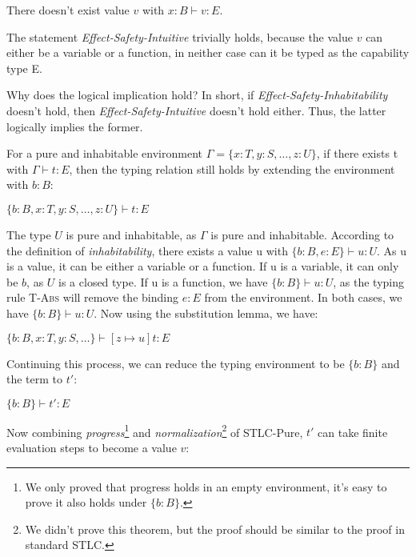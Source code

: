 \begin{definition}
  There doesn't exist value $v$ with $x:B \vdash v : E$.
\end{definition}

The statement \emph{Effect-Safety-Intuitive} trivially holds, because
the value $v$ can either be a variable or a function, in neither case
can it be typed as the capability type E.

Why does the logical implication hold? In short, if
\emph{Effect-Safety-Inhabitability} doesn't hold, then
\emph{Effect-Safety-Intuitive} doesn't hold either. Thus, the latter
logically implies the former.

For a pure and inhabitable environment
$\Gamma = \{x:T, y:S, \dots, z:U\}$, if there exists t with
$\Gamma \vdash t : E$, then the typing relation still holds by
extending the environment with $b:B$:

\begin{center}
$\{b:B, x:T, y:S, \dots, z:U\} \vdash t: E$
\end{center}

The type $U$ is pure and inhabitable, as $\Gamma$ is pure and
inhabitable. According to the definition of \emph{inhabitability},
there exists a value u with $\{b:B, e:E\} \vdash u: U$. As u is a
value, it can be either a variable or a function. If u is a variable,
it can only be $b$, as $U$ is a closed type. If u is a function, we
have $\{b:B\} \vdash u: U$, as the typing rule \textsc{T-Abs} will
remove the binding $e:E$ from the environment. In both cases, we have
$\{b:B\} \vdash u: U$. Now using the substitution lemma, we have:

\begin{center}
$\{b:B, x:T, y:S, \dots\} \vdash [z \mapsto u]t: E$
\end{center}

Continuing this process, we can reduce the typing environment to be
$\{b:B\}$ and the term to $t'$:

\begin{center}
$\{b:B\} \vdash t': E$
\end{center}

Now combining \emph{progress}\footnote{We only proved that progress
  holds in an empty environment, it's easy to prove it also holds
  under $\{b:B\}$.} and \emph{normalization}\footnote{We didn't prove
  this theorem, but the proof should be similar to the proof in
  standard STLC.}  of STLC-Pure, $t'$ can take finite evaluation steps
to become a value $v$:

